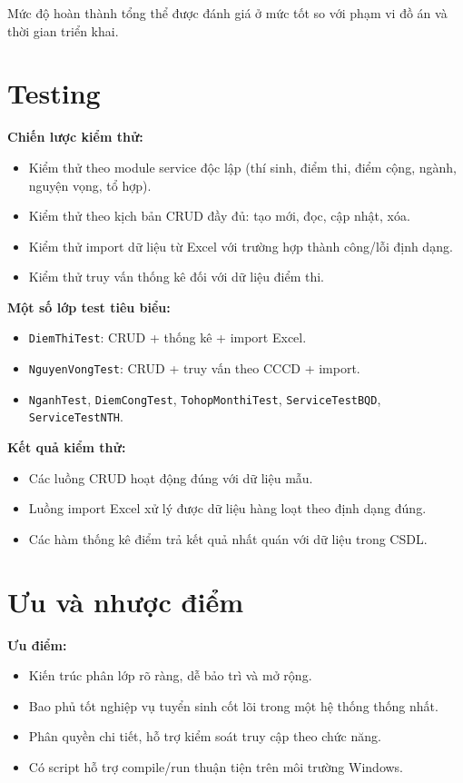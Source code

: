 \documentclass[12pt,a4paper,oneside]{report}
\begin{document}
Mức độ hoàn thành tổng thể được đánh giá ở mức tốt so với phạm vi đồ án và thời gian triển khai.

\section{Testing}
\textbf{Chiến lược kiểm thử:}
\begin{itemize}
  \item Kiểm thử theo module service độc lập (thí sinh, điểm thi, điểm cộng, ngành, nguyện vọng, tổ hợp).
  \item Kiểm thử theo kịch bản CRUD đầy đủ: tạo mới, đọc, cập nhật, xóa.
  \item Kiểm thử import dữ liệu từ Excel với trường hợp thành công/lỗi định dạng.
  \item Kiểm thử truy vấn thống kê đối với dữ liệu điểm thi.
\end{itemize}

\textbf{Một số lớp test tiêu biểu:}
\begin{itemize}
  \item \texttt{DiemThiTest}: CRUD + thống kê + import Excel.
  \item \texttt{NguyenVongTest}: CRUD + truy vấn theo CCCD + import.
  \item \texttt{NganhTest}, \texttt{DiemCongTest}, \texttt{TohopMonthiTest}, \texttt{ServiceTestBQD}, \texttt{ServiceTestNTH}.
\end{itemize}

\textbf{Kết quả kiểm thử:}
\begin{itemize}
  \item Các luồng CRUD hoạt động đúng với dữ liệu mẫu.
  \item Luồng import Excel xử lý được dữ liệu hàng loạt theo định dạng đúng.
  \item Các hàm thống kê điểm trả kết quả nhất quán với dữ liệu trong CSDL.
\end{itemize}

\section{Ưu và nhược điểm}
\textbf{Ưu điểm:}
\begin{itemize}
  \item Kiến trúc phân lớp rõ ràng, dễ bảo trì và mở rộng.
  \item Bao phủ tốt nghiệp vụ tuyển sinh cốt lõi trong một hệ thống thống nhất.
  \item Phân quyền chi tiết, hỗ trợ kiểm soát truy cập theo chức năng.
  \item Có script hỗ trợ compile/run thuận tiện trên môi trường Windows.
\end{itemize}
\end{document}

